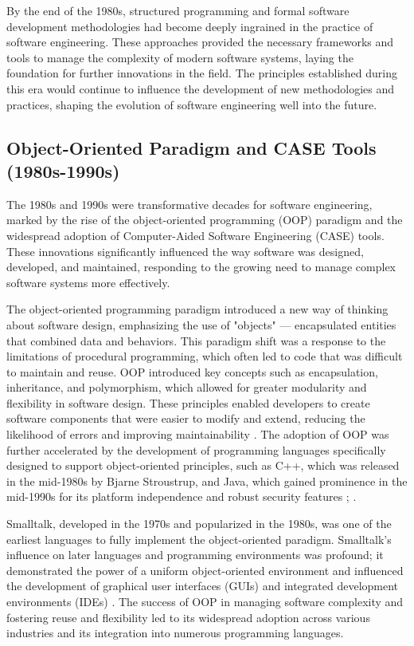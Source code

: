 \begin{refsection}
By the end of the 1980s, structured programming and formal software development methodologies had become deeply ingrained in the practice of software engineering. These approaches provided the necessary frameworks and tools to manage the complexity of modern software systems, laying the foundation for further innovations in the field. The principles established during this era would continue to influence the development of new methodologies and practices, shaping the evolution of software engineering well into the future.

\subsection{Object-Oriented Paradigm and CASE Tools (1980s-1990s)}

The 1980s and 1990s were transformative decades for software engineering, marked by the rise of the object-oriented programming (OOP) paradigm and the widespread adoption of Computer-Aided Software Engineering (CASE) tools. These innovations significantly influenced the way software was designed, developed, and maintained, responding to the growing need to manage complex software systems more effectively.

The object-oriented programming paradigm introduced a new way of thinking about software design, emphasizing the use of "objects" — encapsulated entities that combined data and behaviors. This paradigm shift was a response to the limitations of procedural programming, which often led to code that was difficult to maintain and reuse. OOP introduced key concepts such as encapsulation, inheritance, and polymorphism, which allowed for greater modularity and flexibility in software design. These principles enabled developers to create software components that were easier to modify and extend, reducing the likelihood of errors and improving maintainability \cite[pp.~23-26]{gamma2015design}. The adoption of OOP was further accelerated by the development of programming languages specifically designed to support object-oriented principles, such as C++, which was released in the mid-1980s by Bjarne Stroustrup, and Java, which gained prominence in the mid-1990s for its platform independence and robust security features \cite[pp.~102-105]{stroustrup2013cpp}; \cite[pp.~21-24]{arnold2003java}.

Smalltalk, developed in the 1970s and popularized in the 1980s, was one of the earliest languages to fully implement the object-oriented paradigm. Smalltalk's influence on later languages and programming environments was profound; it demonstrated the power of a uniform object-oriented environment and influenced the development of graphical user interfaces (GUIs) and integrated development environments (IDEs) \cite[pp.~69-72]{kay1993smalltalk}. The success of OOP in managing software complexity and fostering reuse and flexibility led to its widespread adoption across various industries and its integration into numerous programming languages.


\end{refsection}
